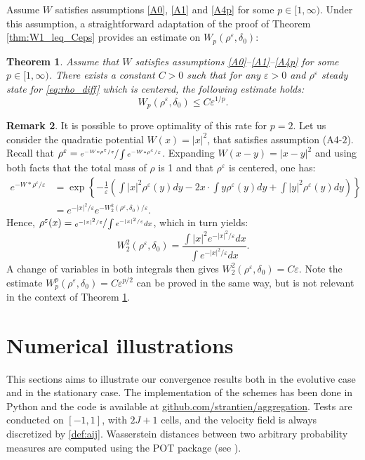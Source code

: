 \documentclass[11pt]{article}
\numberwithin{equation}{section}
\def\eps{\varepsilon}
\theoremstyle{plain}
\newtheorem{theorem}{Theorem}[section]
\theoremstyle{definition}
\newtheorem{remark}[theorem]{Remark}
\begin{document}
Assume $W$ satisfies assumptions \eqref{A0}, \eqref{A1} and \eqref{A4p} for some $p \in [1, \infty)$. Under this assumption, a straightforward adaptation of the proof of Theorem \ref{thm:W1_leq_Ceps} provides an estimate on $W_p(\rho^\eps, \delta_0)$:
\begin{theorem}\label{TWp}
Assume that $W$ satisfies assumptions \eqref{A0}--\eqref{A1}--\eqref{A4p} for some $p \in [1, \infty)$. There exists a constant $C > 0$ such that for any $\eps>0$ and $\rho^\eps$ steady state for \eqref{eq:rho_diff} which is centered, the following estimate holds:
\begin{equation}\label{Wp_leq_Ceps_bis}
W_p(\rho^\eps, \delta_0) \leq C\eps^{1/p}.
\end{equation}
\end{theorem}
\begin{remark}
It is possible to prove optimality of this rate for $p=2$. Let us consider the quadratic potential $W(x) = |x|^2$, that satisfies assumption (A4-$2$). Recall that $\rho^\eps = \sfrac{e^{-W * \rho^\eps / \eps}}{\int e^{-W * \rho^\eps / \eps}}$. Expanding $W(x-y) = |x-y|^2$ and using both facts that the total mass of $\rho$ is 1 and that $\rho^\eps$ is centered, one has:
\begin{align*}
e^{-W * \rho^\eps / \eps} & = \exp\left\lbrace -\frac{1}{\eps} \left(\int|x|^2 \rho^\eps(y) dy - 2x \cdot \int y \rho^\eps(y) dy + \int|y|^2\rho^\eps(y) dy \right) \right\rbrace \\
& = e^{-|x|^2/\eps} e^{-W_2^2(\rho^\eps, \delta_0)/\eps}.
\end{align*}
Hence, $\rho^\eps(x) = \sfrac{e^{-|x|^2 / \eps}}{\int e^{-|x|^2 / \eps} dx}$, which in turn yields:
\[
W_2^2(\rho^\eps, \delta_0) = \frac{\int |x|^2 e^{-|x|^2 / \eps} dx}{\int e^{-|x|^2 / \eps} dx}.
\]
A change of variables in both integrals then gives $W_2^2(\rho^\eps, \delta_0) = C\eps$. Note the estimate $W_p^p(\rho^\eps, \delta_0) = C\eps^{p/2}$ can be proved in the same way, but is not relevant in the context of Theorem \ref{TWp}.
\end{remark}

\section{Numerical illustrations}\label{section:numerics}

This sections aims to illustrate our convergence results both in the evolutive case and in the stationary case. The implementation of the schemes has been done in Python and the code is available at \href{https://github.com/strantien/aggregation}{github.com/strantien/aggregation}. Tests are conducted on $[-1,1]$, with $2J+1$ cells, and the velocity field is always discretized by \eqref{def:aij}. Wasserstein distances between two arbitrary probability measures are computed using the POT package (see \cite{flamary2021pot}).
\end{document}
